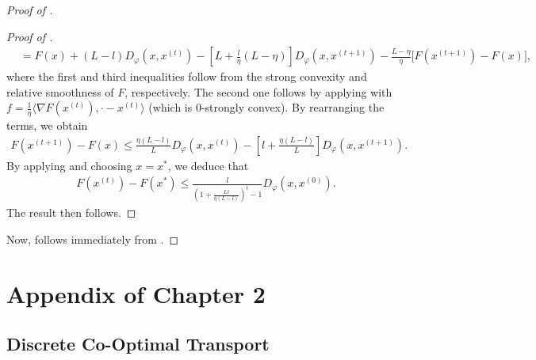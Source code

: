 \begin{proof}[Proof of ]
\begin{proof}[Proof of ]
\begin{align}
    &= F(x) + (L - l) D_{\varphi}(x, x^{(t)})
    - \left[ L + \frac{l}{\eta}(L - \eta) \right] D_{\varphi}(x, x^{(t+1)})
    - \frac{L - \eta}{\eta} \big[ F(x^{(t+1)}) - F(x) \big],
\end{align}
where the first and third inequalities follow from the strong convexity and
relative smoothness of $F$, respectively. The second one follows by applying
 with
$f = \frac{1}{\eta} \langle \nabla F(x^{(t)}), \cdot - x^{(t)} \rangle$
(which is $0$-strongly convex). By rearranging the terms, we obtain
\begin{align}
    F(x^{(t+1)}) - F(x) \leq \frac{\eta(L-l)}{L} D_{\varphi}(x, x^{(t)})
    - \left[ l + \frac{\eta (L - l)}{L} \right] D_{\varphi}(x, x^{(t+1)}).
\end{align}
By applying  and choosing $x = x^*$, we deduce that
\begin{align}
    F(x^{(t)}) - F(x^*) \leq \frac{l}{\left( 1 + \frac{Ll }{\eta (L - l)} \right)^t - 1}
    D_{\varphi}(x, x^{(0)}).
\end{align}
The result then follows.
\end{proof}
Now,  follows immediately from
.
\end{proof}

\section{Appendix of Chapter 2}

\subsection{Discrete Co-Optimal Transport}

